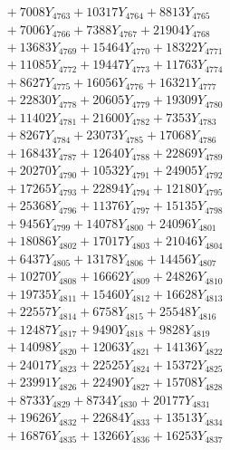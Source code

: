 \documentclass[a4paper,10pt]{article}
\begin{document}
{\begin{align}
&\;  + 7008 Y_{4763} + 10317 Y_{4764} + 8813 Y_{4765} \\[0.3ex]
&\;  + 7006 Y_{4766} + 7388 Y_{4767} + 21904 Y_{4768} \\[0.5ex]\allowbreak
&\;  + 13683 Y_{4769} + 15464 Y_{4770} + 18322 Y_{4771} \\[0.3ex]
&\;  + 11085 Y_{4772} + 19447 Y_{4773} + 11763 Y_{4774} \\[0.3ex]
&\;  + 8627 Y_{4775} + 16056 Y_{4776} + 16321 Y_{4777} \\[0.3ex]
&\;  + 22830 Y_{4778} + 20605 Y_{4779} + 19309 Y_{4780} \\[0.3ex]
&\;  + 11402 Y_{4781} + 21600 Y_{4782} + 7353 Y_{4783} \\[0.3ex]
&\;  + 8267 Y_{4784} + 23073 Y_{4785} + 17068 Y_{4786} \\[0.3ex]
&\;  + 16843 Y_{4787} + 12640 Y_{4788} + 22869 Y_{4789} \\[0.3ex]
&\;  + 20270 Y_{4790} + 10532 Y_{4791} + 24905 Y_{4792} \\[0.3ex]
&\;  + 17265 Y_{4793} + 22894 Y_{4794} + 12180 Y_{4795} \\[0.3ex]
&\;  + 25368 Y_{4796} + 11376 Y_{4797} + 15135 Y_{4798} \\[0.5ex]\allowbreak
&\;  + 9456 Y_{4799} + 14078 Y_{4800} + 24096 Y_{4801} \\[0.3ex]
&\;  + 18086 Y_{4802} + 17017 Y_{4803} + 21046 Y_{4804} \\[0.3ex]
&\;  + 6437 Y_{4805} + 13178 Y_{4806} + 14456 Y_{4807} \\[0.3ex]
&\;  + 10270 Y_{4808} + 16662 Y_{4809} + 24826 Y_{4810} \\[0.3ex]
&\;  + 19735 Y_{4811} + 15460 Y_{4812} + 16628 Y_{4813} \\[0.3ex]
&\;  + 22557 Y_{4814} + 6758 Y_{4815} + 25548 Y_{4816} \\[0.3ex]
&\;  + 12487 Y_{4817} + 9490 Y_{4818} + 9828 Y_{4819} \\[0.3ex]
&\;  + 14098 Y_{4820} + 12063 Y_{4821} + 14136 Y_{4822} \\[0.3ex]
&\;  + 24017 Y_{4823} + 22525 Y_{4824} + 15372 Y_{4825} \\[0.3ex]
&\;  + 23991 Y_{4826} + 22490 Y_{4827} + 15708 Y_{4828} \\[0.5ex]\allowbreak
&\;  + 8733 Y_{4829} + 8734 Y_{4830} + 20177 Y_{4831} \\[0.3ex]
&\;  + 19626 Y_{4832} + 22684 Y_{4833} + 13513 Y_{4834} \\[0.3ex]
&\;  + 16876 Y_{4835} + 13266 Y_{4836} + 16253 Y_{4837} \\[0.3ex]

\end{align}}
\end{document}
